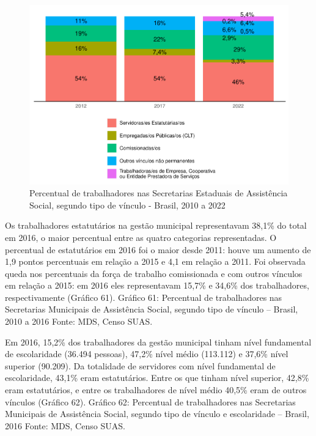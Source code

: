 \documentclass[
  brazilian]{report}
\begin{document}
\begin{figure}
\includegraphics{Censo-SUAS-2022_files/figure-latex/uf_trab_vin-1} \caption[Percentual de trabalhadores nas Secretarias Estaduais de Assistência Social, segundo tipo de vínculo - Brasil, 2010 a 2022]{Percentual de trabalhadores nas Secretarias Estaduais de Assistência Social, segundo tipo de vínculo - Brasil, 2010 a 2022}\label{fig:uf_trab_vin}
\end{figure}

Os trabalhadores estatutários na gestão municipal representavam 38,1\%
do total em 2016, o maior percentual entre as quatro categorias
representadas. O percentual de estatutários em 2016 foi o maior desde
2011: houve um aumento de 1,9 pontos percentuais em relação a 2015 e 4,1
em relação a 2011. Foi observada queda nos percentuais da força de
trabalho comissionada e com outros vínculos em relação a 2015: em 2016
eles representavam 15,7\% e 34,6\% dos trabalhadores, respectivamente
(Gráfico 61). Gráfico 61: Percentual de trabalhadores nas Secretarias
Municipais de Assistência Social, segundo tipo de vínculo -- Brasil,
2010 a 2016 Fonte: MDS, Censo SUAS.

Em 2016, 15,2\% dos trabalhadores da gestão municipal tinham nível
fundamental de escolaridade (36.494 pessoas), 47,2\% nível médio
(113.112) e 37,6\% nível superior (90.209). Da totalidade de servidores
com nível fundamental de escolaridade, 43,1\% eram estatutários. Entre
os que tinham nível superior, 42,8\% eram estatutários, e entre os
trabalhadores de nível médio 40,5\% eram de outros vínculos (Gráfico
62). Gráfico 62: Percentual de trabalhadores nas Secretarias Municipais
de Assistência Social, segundo tipo de vínculo e escolaridade -- Brasil,
2016 Fonte: MDS, Censo SUAS.
\end{document}
